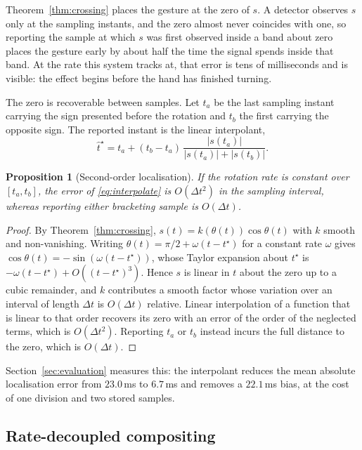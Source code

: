 \documentclass{article}
\newtheorem{proposition}{Proposition}
\theoremstyle{definition}
\begin{document}
Theorem~\ref{thm:crossing} places the gesture at the zero of $s$. A detector
observes $s$ only at the sampling instants, and the zero almost never coincides
with one, so reporting the sample at which $s$ was first observed inside a band
about zero places the gesture early by about half the time the signal spends
inside that band. At the rate this system tracks at, that error is tens of
milliseconds and is visible: the effect begins before the hand has finished
turning.

The zero is recoverable between samples. Let $t_a$ be the last sampling instant
carrying the sign presented before the rotation and $t_b$ the first carrying the
opposite sign. The reported instant is the linear interpolant,
\begin{equation}
  \label{eq:interpolate}
  \hat{t}^\star = t_a + (t_b - t_a)\,\frac{|s(t_a)|}{|s(t_a)| + |s(t_b)|}.
\end{equation}

\begin{proposition}[Second-order localisation]
\label{prop:interpolation}
If the rotation rate is constant over $[t_a, t_b]$, the error of
\eqref{eq:interpolate} is $O(\Delta t^2)$ in the sampling interval, whereas
reporting either bracketing sample is $O(\Delta t)$.
\end{proposition}

\begin{proof}
By Theorem~\ref{thm:crossing}, $s(t) = k(\theta(t))\cos\theta(t)$ with $k$
smooth and non-vanishing. Writing $\theta(t) = \pi/2 + \omega(t - t^\star)$ for a
constant rate $\omega$ gives $\cos\theta(t) = -\sin(\omega(t - t^\star))$, whose
Taylor expansion about $t^\star$ is $-\omega(t - t^\star) + O((t-t^\star)^3)$.
Hence $s$ is linear in $t$ about the zero up to a cubic remainder, and $k$
contributes a smooth factor whose variation over an interval of length $\Delta t$
is $O(\Delta t)$ relative. Linear interpolation of a function that is linear to
that order recovers its zero with an error of the order of the neglected terms,
which is $O(\Delta t^2)$. Reporting $t_a$ or $t_b$ instead incurs the full
distance to the zero, which is $O(\Delta t)$.
\end{proof}

Section~\ref{sec:evaluation} measures this: the interpolant reduces the mean
absolute localisation error from $23.0$\,ms to $6.7$\,ms and removes a
$22.1$\,ms bias, at the cost of one division and two stored samples.

\subsection{Rate-decoupled compositing}
\label{sec:decoupled}
\end{document}
